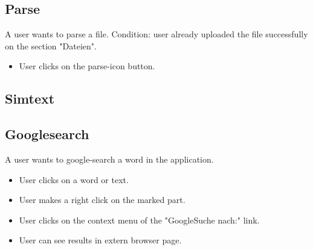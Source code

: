 \subsection{Parse}
A user wants to parse a file.
\minisec{}
Condition: user already uploaded the file successfully on the section "Dateien".
\minisec{}
\begin{itemize}
\item User clicks on the parse-icon button.
\end{itemize}
\subsection{Simtext}
\subsection{Googlesearch}
A user wants to google-search a word in the application.
\minisec{}
\begin{itemize}
\item User clicks on a word or text.
\item User makes a right click on the marked part.
\item User clicks on the context menu of the  "GoogleSuche nach:" link.
\item User can see results in extern browser page.
\end{itemize}


